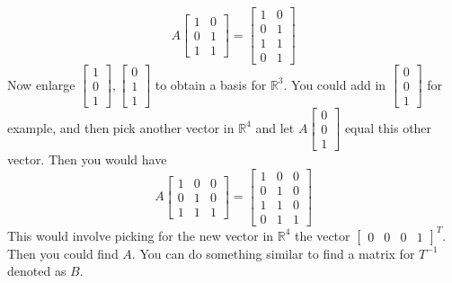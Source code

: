 \documentclass{ximera}
\begin{document}
\begin{problem}
\begin{equation*}
A\left[
\begin{array}{cc}
1 & 0 \\
0 & 1 \\
1 & 1
\end{array}
\right] =\left[
\begin{array}{cc}
1 & 0 \\
0 & 1 \\
1 & 1 \\
0 & 1
\end{array}
\right]
\end{equation*}
Now enlarge $\left[
\begin{array}{c}
1 \\
0 \\
1
\end{array}
\right] ,\left[
\begin{array}{c}
0 \\
1 \\
1
\end{array}
\right] $ to obtain a basis for $\mathbb{R}^{3}$. You could add in $\left[
\begin{array}{c}
0 \\
0 \\
1
\end{array}
\right] $ for example, and then pick another vector in $\mathbb{R}^{4}$ and
let $A\left[
\begin{array}{c}
0 \\
0 \\
1
\end{array}
\right] $ equal this other vector. Then you would have
\begin{equation*}
A\left[
\begin{array}{ccc}
1 & 0 & 0 \\
0 & 1 & 0 \\
1 & 1 & 1
\end{array}
\right] =\left[
\begin{array}{ccc}
1 & 0 & 0 \\
0 & 1 & 0 \\
1 & 1 & 0 \\
0 & 1 & 1
\end{array}
\right]
\end{equation*}
This would involve picking for the new vector in $\mathbb{R}^{4}$ the vector
$\left[
\begin{array}{cccc}
0 & 0 & 0 & 1
\end{array}
\right] ^{T}.$ Then you could find $A$. You can do something similar to find
a matrix for $T^{-1}$ denoted as $B$.
\end{problem}
\end{document}
